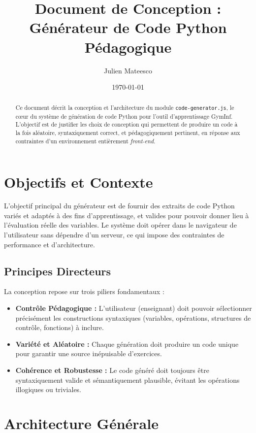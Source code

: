 \documentclass[a4paper, 11pt]{article}
\title{Document de Conception : Générateur de Code Python Pédagogique}
\author{Julien Mateesco}
\date{\today}
\begin{document}
\maketitle

\begin{abstract}
Ce document décrit la conception et l'architecture du module \texttt{code-generator.js}, 
le cœur du système de génération de code Python pour l'outil d'apprentissage GymInf. 
L'objectif est de justifier les choix de conception qui permettent de produire un code à la fois aléatoire, 
syntaxiquement correct, et pédagogiquement pertinent, 
en réponse aux contraintes d'un environnement entièrement \textit{front-end}.
\end{abstract}

\section{Objectifs et Contexte}

L'objectif principal du générateur est de fournir des extraits de code Python variés et adaptés à des fins d'apprentissage, et valides pour pouvoir donner lieu à l'évaluation réelle des variables. 
Le système doit opérer dans le navigateur de l'utilisateur sans dépendre d'un serveur, ce qui impose des contraintes 
de performance et d'architecture.

\subsection{Principes Directeurs}
La conception repose sur trois piliers fondamentaux :
\begin{itemize}
    \item \textbf{Contrôle Pédagogique :} L'utilisateur (enseignant) doit pouvoir sélectionner précisément les constructions syntaxiques (variables, opérations, structures de contrôle, fonctions) à inclure.
    \item \textbf{Variété et Aléatoire :} Chaque génération doit produire un code unique pour garantir une source inépuisable d'exercices.
    \item \textbf{Cohérence et Robustesse :} Le code généré doit toujours être syntaxiquement valide et sémantiquement plausible, évitant les opérations illogiques ou triviales.
\end{itemize}

\section{Architecture Générale}
\end{document}
